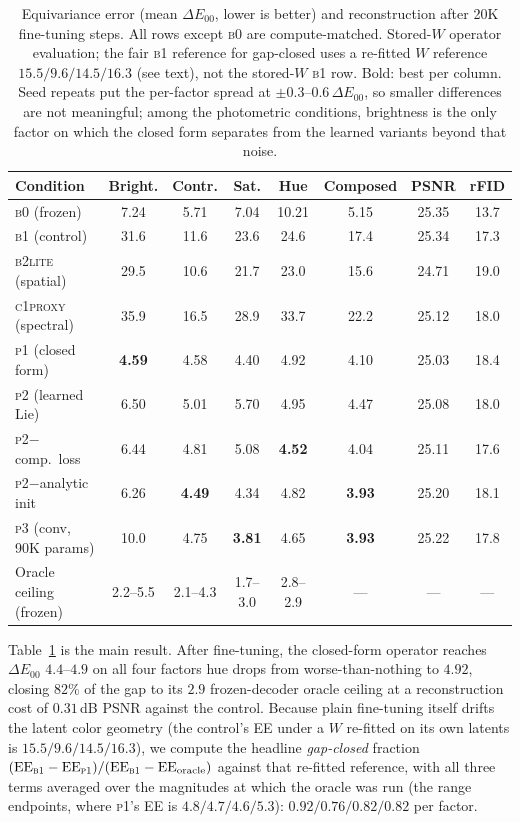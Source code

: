 \documentclass[11pt]{article}
\newcommand{\de}{\Delta E_{00}}
\begin{document}
\begin{table}[t]
\centering
\small
\caption{Equivariance error (mean $\de$, lower is better) and reconstruction
after 20K fine-tuning steps. All rows except \textsc{b0} are compute-matched.
Stored-$W$ operator evaluation; the fair \textsc{b1} reference for gap-closed
uses a re-fitted $W$ reference $15.5/9.6/14.5/16.3$ (see text), not the
stored-$W$ \textsc{b1} row. Bold: best per column. Seed repeats put the
per-factor spread at $\pm 0.3$--$0.6$\,$\de$, so smaller differences are not
meaningful; among the photometric conditions, brightness is the only factor
on which the closed form separates from the learned variants beyond that
noise.}
\label{tab:main}
\begin{tabular}{lccccccc}
\toprule
Condition & Bright. & Contr. & Sat. & Hue & Composed & PSNR & rFID \\
\midrule
\textsc{b0} (frozen)            & 7.24 & 5.71 & 7.04 & 10.21 & 5.15 & 25.35 & 13.7 \\
\textsc{b1} (control)           & 31.6 & 11.6 & 23.6 & 24.6 & 17.4 & 25.34 & 17.3 \\
\textsc{b2lite} (spatial)       & 29.5 & 10.6 & 21.7 & 23.0 & 15.6 & 24.71 & 19.0 \\
\textsc{c1proxy} (spectral)     & 35.9 & 16.5 & 28.9 & 33.7 & 22.2 & 25.12 & 18.0 \\
\midrule
\textsc{p1} (closed form)       & \textbf{4.59} & 4.58 & 4.40 & 4.92 & 4.10 & 25.03 & 18.4 \\
\textsc{p2} (learned Lie)       & 6.50 & 5.01 & 5.70 & 4.95 & 4.47 & 25.08 & 18.0 \\
\textsc{p2}$-$comp.\ loss       & 6.44 & 4.81 & 5.08 & \textbf{4.52} & 4.04 & 25.11 & 17.6 \\
\textsc{p2}$-$analytic init     & 6.26 & \textbf{4.49} & 4.34 & 4.82 & \textbf{3.93} & 25.20 & 18.1 \\
\textsc{p3} (conv, 90K params)  & 10.0 & 4.75 & \textbf{3.81} & 4.65 & \textbf{3.93} & 25.22 & 17.8 \\
\midrule
Oracle ceiling (frozen)         & 2.2--5.5 & 2.1--4.3 & 1.7--3.0 & 2.8--2.9 & --- & --- & --- \\
\bottomrule
\end{tabular}
\end{table}

Table~\ref{tab:main} is the main result. After fine-tuning, the closed-form
operator reaches $\de$ $4.4$--$4.9$ on all four factors hue drops from
worse-than-nothing to $4.92$, closing $82\%$ of the gap to its $2.9$
frozen-decoder oracle ceiling at a reconstruction cost of $0.31$\,dB PSNR
against the control.
Because plain fine-tuning itself drifts the latent color geometry (the
control's EE under a $W$ re-fitted on its own latents is $15.5/9.6/14.5/16.3$),
we compute the headline \emph{gap-closed} fraction
$(\text{EE}_{\textsc{b1}} - \text{EE}_{\textsc{p1}}) /
(\text{EE}_{\textsc{b1}} - \text{EE}_\text{oracle})$ against that re-fitted
reference, with all three terms averaged over the magnitudes at which the
oracle was run (the range endpoints, where \textsc{p1}'s EE is
$4.8/4.7/4.6/5.3$): $0.92 / 0.76 / 0.82 / 0.82$ per factor.
\end{document}
